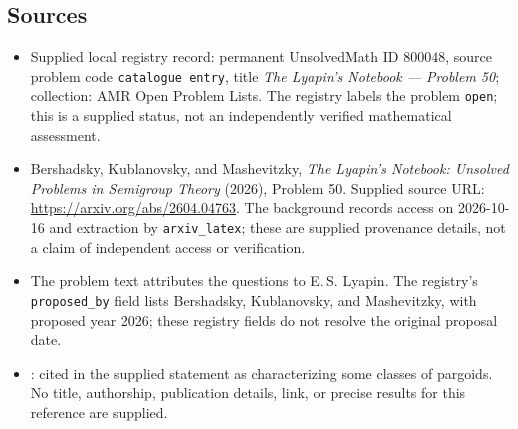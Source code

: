 \documentclass[11pt]{article}
\begin{document}
\subsection{Sources}
\begin{itemize}
\item Supplied local registry record: permanent UnsolvedMath ID \(800048\), source problem code \texttt{catalogue entry}, title \emph{The Lyapin's Notebook --- Problem 50}; collection: AMR Open Problem Lists. The registry labels the problem \texttt{open}; this is a supplied status, not an independently verified mathematical assessment.
\item Bershadsky, Kublanovsky, and Mashevitzky, \emph{The Lyapin's Notebook: Unsolved Problems in Semigroup Theory} (2026), Problem 50. Supplied source URL: \url{https://arxiv.org/abs/2604.04763}. The background records access on 2026-10-16 and extraction by \texttt{arxiv\_latex}; these are supplied provenance details, not a claim of independent access or verification.
\item The problem text attributes the questions to E.\,S. Lyapin. The registry's \texttt{proposed\_by} field lists Bershadsky, Kublanovsky, and Mashevitzky, with proposed year 2026; these registry fields do not resolve the original proposal date.
\item [ESL5]: cited in the supplied statement as characterizing some classes of pargoids. No title, authorship, publication details, link, or precise results for this reference are supplied.
\end{itemize}
\end{document}
